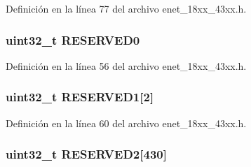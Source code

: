 Definición en la línea 77 del archivo enet\+\_\+18xx\+\_\+43xx.\+h.

\subsubsection[{\texorpdfstring{R\+E\+S\+E\+R\+V\+E\+D0}{RESERVED0}}]{ uint32\+\_\+t R\+E\+S\+E\+R\+V\+E\+D0}\hypertarget{struct_l_p_c___e_n_e_t___t_ad06839c5382047f4f9f2c74cc61db942}{}\label{struct_l_p_c___e_n_e_t___t_ad06839c5382047f4f9f2c74cc61db942}


Definición en la línea 56 del archivo enet\+\_\+18xx\+\_\+43xx.\+h.

\subsubsection[{\texorpdfstring{R\+E\+S\+E\+R\+V\+E\+D1}{RESERVED1}}]{ uint32\+\_\+t R\+E\+S\+E\+R\+V\+E\+D1\mbox{[}2\mbox{]}}\hypertarget{struct_l_p_c___e_n_e_t___t_a67272bc257c032693d52097a78451784}{}\label{struct_l_p_c___e_n_e_t___t_a67272bc257c032693d52097a78451784}


Definición en la línea 60 del archivo enet\+\_\+18xx\+\_\+43xx.\+h.

\subsubsection[{\texorpdfstring{R\+E\+S\+E\+R\+V\+E\+D2}{RESERVED2}}]{ uint32\+\_\+t R\+E\+S\+E\+R\+V\+E\+D2\mbox{[}430\mbox{]}}\hypertarget{struct_l_p_c___e_n_e_t___t_a382eb02b18eca8227ecf59f2895f498e}{}\label{struct_l_p_c___e_n_e_t___t_a382eb02b18eca8227ecf59f2895f498e}


